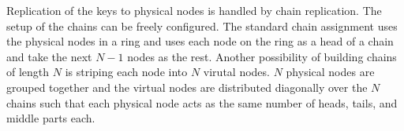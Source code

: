 Replication of the keys to physical \glspl{node} is handled by chain replication.
The setup of the chains can be freely configured.
The standard chain assignment uses the physical \glspl{node} in a ring and uses each \gls{node} on the ring as a head of a chain and take the next $N-1$ \glspl{node} as the rest.
Another possibility of building chains of length $N$ is striping each \gls{node} into $N$ virutal \glspl{node}.
$N$ physical \glspl{node} are grouped together and the virtual \glspl{node} are distributed diagonally over the $N$ chains such that each physical \gls{node} acts as the same number of heads, tails, and middle parts each.